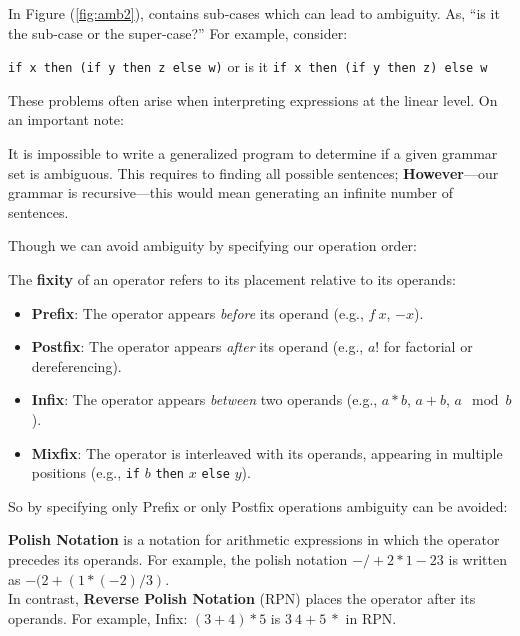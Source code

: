 \noindent
In Figure (\ref{fig:amb2}), contains sub-cases which can lead to ambiguity. As, ``is it the sub-case or the super-case?'' For 
example, consider:
\begin{center}
    \texttt{\textcolor{Wine}{if x then (if y then z else w)}} or is it \texttt{\textcolor{Wine}{if x then (if y then z) else w}}
\end{center}

\noindent 
These problems often arise when interpreting expressions at the linear level. On an important note:
\begin{theo}
    
    It is impossible to write a generalized program to determine if a given grammar set is ambiguous.
    This requires to finding all possible sentences; \textbf{However}---our grammar is recursive---this would mean generating 
    an infinite number of sentences.
\end{theo}

\noindent
Though we can avoid ambiguity by specifying our operation order:
\begin{Def}[Fixity]

    The \textbf{fixity} of an operator refers to its placement relative to its operands:
    
    \begin{itemize}
        \item \textbf{Prefix}: The operator appears \textit{before} its operand (e.g., $f\ x$, $-x$).
        \item \textbf{Postfix}: The operator appears \textit{after} its operand (e.g., $a!$ for factorial or dereferencing).
        \item \textbf{Infix}: The operator appears \textit{between} two operands (e.g., $a * b$, $a + b$, $a \mod b$).
        \item \textbf{Mixfix}: The operator is interleaved with its operands, appearing in multiple positions (e.g., \texttt{if} $b$ \texttt{then} $x$ \texttt{else} $y$).
    \end{itemize} 
    \end{Def}

\newpage 
\noindent
So by specifying only Prefix or only Postfix operations ambiguity can be avoided:
\begin{Def}

    \textbf{Polish Notation} is a notation for arithmetic expressions in which the operator precedes its operands. For example, the polish notation $- / + 2 * 1 - 2 3$ is written as $- (2 + (1 * (- 2) / 3)$.\\
    
    \noindent
    In contrast, \textbf{Reverse Polish Notation} (RPN) places the operator after its operands. For example, Infix: $(3 + 4) * 5$ is $3\ 4 + 5\ *$ in RPN.
\end{Def}

